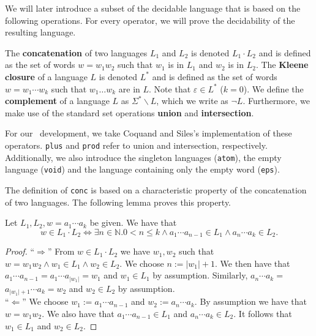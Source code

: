     
    We will later introduce a subset of the decidable language that is based on the following operations. For every operator, we will prove the decidability of the resulting language.

    

    The \textbf{concatenation} of two languages $L_1$ and $L_2$ is denoted $L_1 \cdot L_2$ and is defined as the set of words $w = w_1 w_2$ such that $w_1$ is in $L_1$ and $w_2$ is in $L_2$.
    The \textbf{Kleene closure} of a language $L$ is denoted $L^*$ and is defined as the set of words $w = w_1 \cdots w_k$ such that $w_1 \ldots w_k$ are in $L$. 
    Note that $\varepsilon \in L^*$ ($k=0$).
    We define the \textbf{complement} of a language $L$ as $\Sigma^* \backslash L$, which we write as $\neg L$.
    Furthermore, we make use of the standard set operations \textbf{union} and \textbf{intersection}.

    
    For our \coq\ development,
    we take Coquand and Siles's \cite{DBLP:conf/cpp/CoquandS11} implementation of these operators. 
    \lstinline{plus} and \lstinline{prod} refer to union and intersection, respectively. 
    Additionally, we also introduce the singleton languages (\lstinline{atom}), the empty language (\lstinline{void}) and the language containing only the empty word (\lstinline{eps}).


    
    The definition of \lstinline{conc} is based on a characteristic property of the concatenation of two languages. The following lemma proves this property.

    \begin{lemma}
        \label{concP}
        Let $L_1, L_2, w = a_1 \cdots a_k$ be given. We have that
        \begin{equation*}
            w \in L_1 \cdot L_2  
            \iff
            \exists n \in \mathbb{N}. 0 < n \le k \wedge a_1 \cdots a_{n-1} \in L_1 \wedge a_n \cdots a_k \in L_2.
        \end{equation*}
    \end{lemma}
    \begin{proof}
        ``$\Rightarrow$'' 
        From $w \in L_1 \cdot L_2$ we have $w_1, w_2$ such that $w = w_1 w_2 \wedge w_1 \in L_1 \wedge w_2 \in L_2$.
        We choose $n := |w_1|+1$. We then have that $a_1 \cdots a_{n-1} = a_1 \cdots a_{|w_1|} = w_1$ and $w_1 \in L_1$ by assumption.
        Similarly, $a_{n} \cdots a_k = $$ a_{|w_1| + 1} \cdots a_k = w_2$ and $w_2 \in L_2$ by assumption.
        \\
        ``$\Leftarrow$'' 
        We choose $w_1 := a_1 \cdots a_{n-1}$ and $w_2 := a_n \cdots a_k$. By assumption we have that $w = w_1 w_2$.
        We also have that $a_1 \cdots a_{n-1} \in L_1$ and $a_{n} \cdots a_k \in L_2$. 
        It follows that $w_1 \in L_1$ and $w_2 \in L_2$.
    \end{proof}
    

